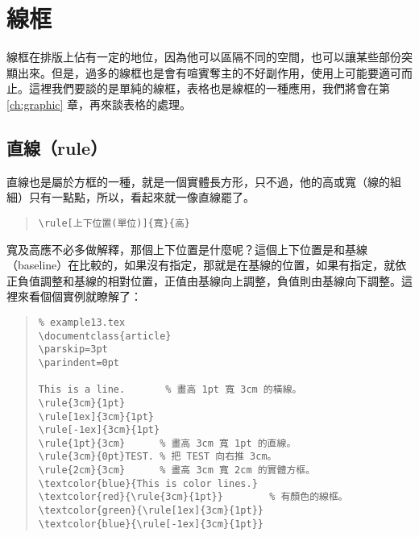 


\section{線框}

線框在排版上佔有一定的地位，因為他可以區隔不同的空間，也可以讓某些部份突顯出來。但是，過多的線框也是會有喧賓奪主的不好副作用，使用上可能要適可而止。這裡我們要談的是單純的線框，表格也是線框的一種應用，我們將會在第 \ref{ch:graphic} 章，再來談表格的處理。



\subsection{直線（rule）}

直線也是屬於方框的一種，就是一個實體長方形，只不過，他的高或寬（線的組細）只有一點點，所以，看起來就一像直線罷了。

\begin{quote}
   \begin{verbatim}
\rule[上下位置(單位)]{寬}{高}
\end{verbatim}
\end{quote}

寬及高應不必多做解釋，那個上下位置是什麼呢？這個上下位置是和基線（baseline）在比較的，如果沒有指定，那就是在基線的位置，如果有指定，就依正負值調整和基線的相對位置，正值由基線向上調整，負值則由基線向下調整。這裡來看個個實例就瞭解了：

\begin{quote}
   \begin{verbatim}
% example13.tex
\documentclass{article}
\parskip=3pt
\parindent=0pt

This is a line.       % 畫高 1pt 寬 3cm 的橫線。
\rule{3cm}{1pt}
\rule[1ex]{3cm}{1pt}
\rule[-1ex]{3cm}{1pt}
\rule{1pt}{3cm}      % 畫高 3cm 寬 1pt 的直線。
\rule{3cm}{0pt}TEST. % 把 TEST 向右推 3cm。
\rule{2cm}{3cm}      % 畫高 3cm 寬 2cm 的實體方框。
\textcolor{blue}{This is color lines.}
\textcolor{red}{\rule{3cm}{1pt}}        % 有顏色的線框。
\textcolor{green}{\rule[1ex]{3cm}{1pt}}
\textcolor{blue}{\rule[-1ex]{3cm}{1pt}}

\end{verbatim}
\end{quote}

